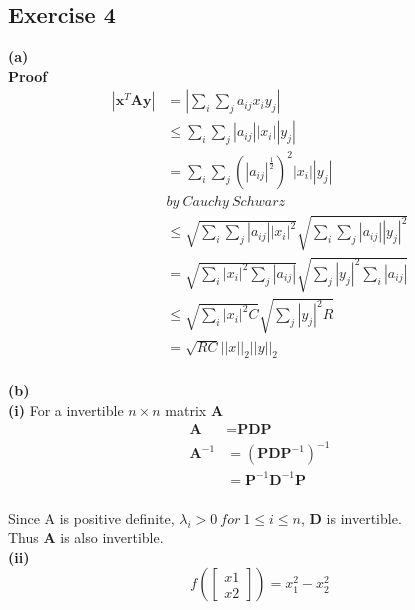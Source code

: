 \documentclass[11pt]{article}
\begin{document}
\subsection*{Exercise 4}
\noindent\textbf{(a)}\\
\textbf{Proof}
\begin{equation} \label{4.a}
\begin{split}
\left|\textbf{x}^T\textbf{Ay}\right|&=\left|\sum_{i}\sum_{j}a_{ij}x_iy_j\right|\\
&\le\sum_i\sum_j\left|a_{ij}\right|\left|x_i\right|\left|y_j\right|\\
&=\sum_i\sum_j(\left|a_{ij}\right|^\frac{1}{2})^2\left|x_i\right|\left|y_j\right|\\
&by\ Cauchy\ Schwarz\\
&\le\sqrt{\sum_i\sum_j\left|a_{ij}\right|\left|x_i\right|^2}\sqrt{\sum_i\sum_j\left|a_{ij}\right|\left|y_j\right|^2}\\
&=\sqrt{\sum_i\left|x_i\right|^2\sum_j\left|a_{ij}\right|}\sqrt{\sum_j\left|y_j\right|^2\sum_i\left|a_{ij}\right|}\\
&\le\sqrt{\sum_i\left|x_i\right|^2C}\sqrt{\sum_j\left|y_j\right|^2R}\\
&=\sqrt{RC}||x||_2||y||_2\\
\end{split}
\end{equation}

\noindent\textbf{(b)}\\

\textbf{(i)}
For a invertible $n\times n$ matrix \textbf{A}\\
\begin{equation} \label{eq6}
\begin{split}
\textbf{A}&=\textbf{PDP}\\
\textbf{A}^{-1}&=(\textbf{PDP}^{-1})^{-1}\\
&=\textbf{P}^{-1}\textbf{D}^{-1}\textbf{P}\\
\end{split}
\end{equation}

Since A is positive definite, $\lambda_i > 0\ for\ 1\le i\le n$, $\textbf{D}$ is invertible.\\

Thus \textbf{A} is also invertible.\\

\textbf{(ii)}
$$f\left(\begin{bmatrix}
x1\\x2
\end{bmatrix}\right) = x_1^2-x_2^2$$
\end{document}
